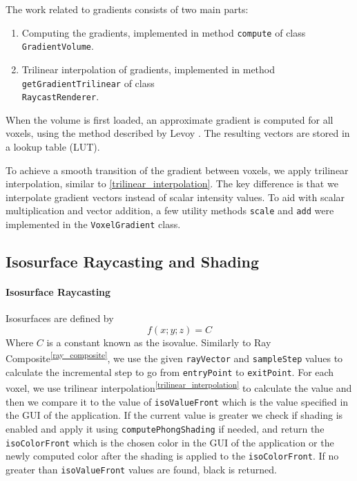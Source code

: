 \documentclass[a4paper]{article}
\begin{document}
The work related to gradients consists of two main parts:

\begin{enumerate}[noitemsep]
  \item Computing the gradients, implemented in method {\tt compute} of class {\tt GradientVolume}.
  \item Trilinear interpolation of gradients, implemented in method {\tt getGradientTrilinear} of class\\ {\tt RaycastRenderer}.
\end{enumerate}

\noindent When the volume is first loaded, an approximate gradient is computed for all voxels, using the method described by Levoy \citep{levoy_1988}. The resulting vectors are stored in a lookup table (LUT).

To achieve a smooth transition of the gradient between voxels, we apply trilinear interpolation, similar to \autoref{trilinear_interpolation}. The key difference is that we interpolate gradient vectors instead of scalar intensity values. To aid with scalar multiplication and vector addition, a few utility methods {\tt scale} and {\tt add} were implemented in the {\tt VoxelGradient} class.

\subsection{Isosurface Raycasting and Shading}
\label{subsec:isosurface}

\paragraph{Isosurface Raycasting}

Isosurfaces are defined by
 $$f(x; y; z) = C$$ 
Where $C$ is a constant known as the isovalue. Similarly to Ray Composite\textsuperscript{\autoref{ray_composite}}, we use the given {\tt rayVector} and {\tt sampleStep} values to calculate the incremental step to go from {\tt entryPoint} to {\tt exitPoint}. For each voxel, we use trilinear interpolation\textsuperscript{\autoref{trilinear_interpolation}} to calculate the value and then we compare it to the value of {\tt isoValueFront} which is the value specified in the GUI of the application. If the current value is greater we check if shading is enabled and apply it using {\tt computePhongShading} if needed, and return the {\tt isoColorFront} which is the chosen color in the GUI of the application or the newly computed color after the shading is applied to the  {\tt isoColorFront}. If no greater than {\tt isoValueFront} values are found, black is returned. 
\end{document}
